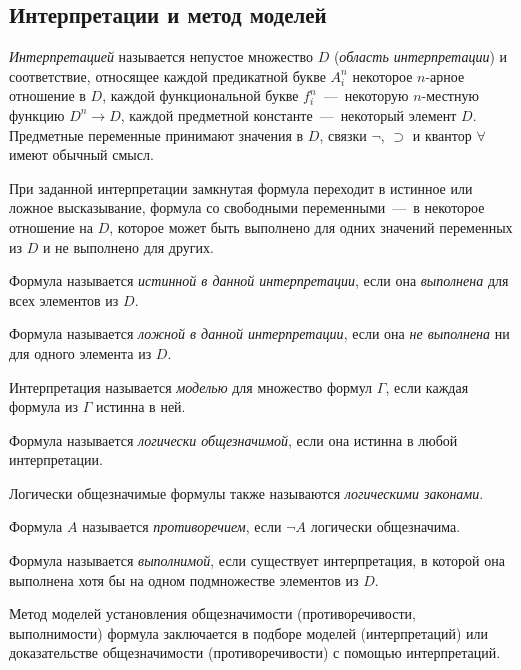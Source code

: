 \subsection{Интерпретации и метод моделей}
\begin{definition*}
    \textit{Интерпретацией} называется непустое множество $D$ (\textit{область интерпретации}) и соответствие, относящее каждой предикатной букве $A_i^n$ некоторое $n$-арное отношение в $D$, каждой функциональной букве $f_i^n$~---~некоторую $n$-местную функцию $D^n \to D$, каждой предметной константе~---~некоторый элемент $D$. Предметные переменные принимают значения в $D$, связки $\neg$, $\supset$ и квантор $\forall$ имеют обычный смысл.
\end{definition*}
При заданной интерпретации замкнутая формула переходит в истинное или ложное высказывание, формула со свободными переменными~---~в некоторое отношение на $D$, которое может быть выполнено для одних значений переменных из $D$ и не выполнено для других.
\begin{definition*}
    Формула называется \textit{истинной в данной интерпретации}, если она \textit{выполнена} для всех элементов из $D$.
\end{definition*}
\begin{definition*}
    Формула называется \textit{ложной в данной интерпретации}, если она \textit{не выполнена} ни для одного элемента из $D$.
\end{definition*}
\begin{definition*}
    Интерпретация называется \textit{моделью} для множество формул $\Gamma$, если каждая формула из $\Gamma$ истинна в ней.
\end{definition*}
\begin{definition*}
    Формула называется \textit{логически общезначимой}, если она истинна в любой интерпретации.
\end{definition*}
Логически общезначимые формулы также называются \textit{логическими законами}.
\begin{definition*}
    Формула $A$ называется \textit{противоречием}, если $\neg A$ логически общезначима.
\end{definition*}
\begin{definition*}
    Формула называется \textit{выполнимой}, если существует интерпретация, в которой она выполнена хотя бы на одном подмножестве элементов из $D$.
\end{definition*}
Метод моделей установления общезначимости (противоречивости, выполнимости) формула заключается в подборе моделей (интерпретаций) или доказательстве общезначимости (противоречивости) с помощью интерпретаций.